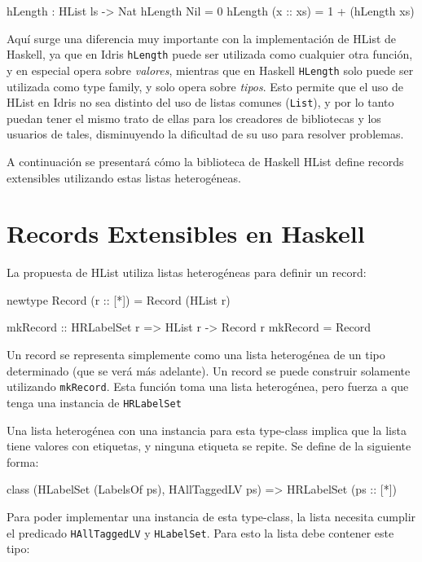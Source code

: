\begin{code}
hLength : HList ls -> Nat
hLength Nil = 0
hLength (x :: xs) = 1 + (hLength xs)
\end{code}

Aquí surge una diferencia muy importante con la implementación de HList de Haskell, ya que en Idris \texttt{hLength} puede ser utilizada como cualquier otra función, y en especial opera sobre \textit{valores}, mientras que en Haskell \texttt{HLength} solo puede ser utilizada como type family, y solo opera sobre \textit{tipos}.
Esto permite que el uso de HList en Idris no sea distinto del uso de listas comunes (\texttt{List}), y por lo tanto puedan tener el mismo trato de ellas para los creadores de bibliotecas y los usuarios de tales, disminuyendo la dificultad de su uso para resolver problemas.

A continuación se presentará cómo la biblioteca de Haskell HList define records extensibles utilizando estas listas heterogéneas.

\section{Records Extensibles en Haskell}

La propuesta de HList \cite{Kiselyov:2004:STH:1017472.1017488} utiliza listas heterogéneas para definir un record:

\begin{code}
newtype Record (r :: [*]) = Record (HList r)

mkRecord :: HRLabelSet r => HList r -> Record r
mkRecord = Record
\end{code}

Un record se representa simplemente como una lista heterogénea de un tipo determinado (que se verá más adelante). Un record se puede construir solamente utilizando \texttt{mkRecord}. Esta función toma una lista heterogénea, pero fuerza a que tenga una instancia de \texttt{HRLabelSet}

Una lista heterogénea con una instancia para esta type-class implica que la lista tiene valores con etiquetas, y ninguna etiqueta se repite. Se define de la siguiente forma:

\begin{code}
class (HLabelSet (LabelsOf ps), HAllTaggedLV ps) => 
  HRLabelSet (ps :: [*])
\end{code}

Para poder implementar una instancia de esta type-class, la lista necesita cumplir el predicado \texttt{HAllTaggedLV} y \texttt{HLabelSet}. Para esto la lista debe contener este tipo:

